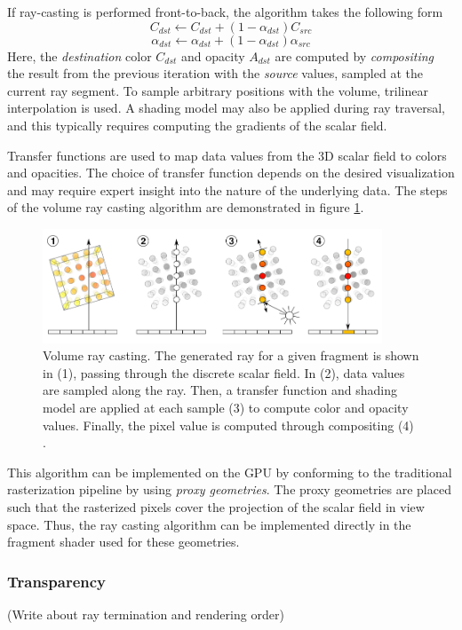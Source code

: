 \documentclass{article}
\begin{document}
If ray-casting is performed front-to-back, the algorithm takes the following form \cite{Kruger2006GPU}
$$ C_{dst} \leftarrow C_{dst} + (1-\alpha_{dst})C_{src} $$
$$ \alpha_{dst} \leftarrow \alpha_{dst} + (1-\alpha_{dst})\alpha_{src}$$
Here, the \textit{destination} color $C_{dst}$ and opacity $A_{dst}$ are computed by 
\textit{compositing} the result from the previous iteration with the \textit{source} values, sampled at the current ray segment. To sample arbitrary positions with the volume, trilinear interpolation is used. A shading model may also be applied during ray traversal,
and this typically requires computing the gradients of the scalar field.

Transfer functions are used to map data values from the 3D scalar field to colors and opacities. The choice of transfer function
depends on the desired visualization and may require expert insight into the nature of the underlying data.
The steps of the volume ray casting algorithm are demonstrated in figure \ref{fig:volumeRayCasting}.

\begin{figure}[tbh]
    \centering
    \includegraphics[width=0.9\textwidth]{images/Volume_ray_casting.png}
    \caption{Volume ray casting. The generated ray for a given fragment is shown in (1), passing through the discrete scalar field. In (2), data values are sampled along the ray. Then, a transfer function and shading model are applied at each sample (3) to compute color and opacity values. Finally, the pixel value
    is computed through compositing (4) \cite{Hofmann2011}.}
    \label{fig:volumeRayCasting}
\end{figure}


This algorithm can be implemented on the GPU by conforming to the traditional rasterization pipeline by using \textit{proxy geometries}.
The proxy geometries are placed such that the rasterized pixels cover the projection of the scalar field in view space. Thus,
the ray casting algorithm can be implemented directly in the fragment shader used for these geometries. 

\subsubsection{Transparency}
(Write about ray termination and rendering order)




\end{document}
